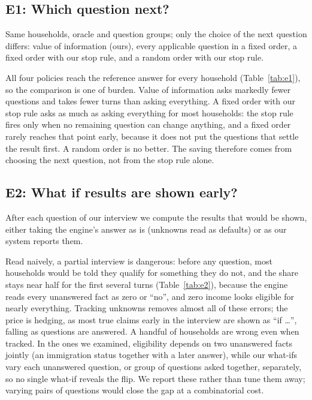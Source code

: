 \documentclass[11pt]{article}
\newcommand{\fq}{false ``you qualify''}
\begin{document}
\subsection{E1: Which question next?}
Same households, oracle and question groups; only the choice of the next question differs: value of information (ours), every applicable question in a fixed order, a fixed order with our stop rule, and a random order with our stop rule.
\begin{table}[t]\centering\small
\resizebox{\linewidth}{!}{}
\caption{E1: question-selection policies over the Tier A and Tier B households, oracle answers. Every policy reaches the reference (each asks until nothing it could ask would change the result); they differ in how many questions that takes.}
\label{tab:e1}
\end{table}
All four policies reach the reference answer for every household (Table~\ref{tab:e1}), so the comparison is one of burden. Value of information asks markedly fewer questions and takes fewer turns than asking everything. A fixed order with our stop rule asks as much as asking everything for most households: the stop rule fires only when no remaining question can change anything, and a fixed order rarely reaches that point early, because it does not put the questions that settle the result first. A random order is no better. The saving therefore comes from choosing the next question, not from the stop rule alone.

\subsection{E2: What if results are shown early?}
After each question of our interview we compute the results that would be shown, either taking the engine's answer as is (unknowns read as defaults) or as our system reports them.
\begin{table}[t]\centering\small
\resizebox{\linewidth}{!}{}
\caption{E2: households whose results, if shown after this many turns, would include a \fq. \emph{Naive}: the engine's answer with unknowns read as its defaults. \emph{Tracked}: what our system reports. \emph{Hedged}: true claims shown as ``if \ldots''.}
\label{tab:e2}
\end{table}
Read naively, a partial interview is dangerous: before any question, most households would be told they qualify for something they do not, and the share stays near half for the first several turns (Table~\ref{tab:e2}), because the engine reads every unanswered fact as zero or ``no'', and zero income looks eligible for nearly everything. Tracking unknowns removes almost all of these errors; the price is hedging, as most true claims early in the interview are shown as ``if \ldots'', falling as questions are answered. A handful of households are wrong even when tracked. In the ones we examined, eligibility depends on two unanswered facts jointly (an immigration status together with a later answer), while our what-ifs vary each unanswered question, or group of questions asked together, separately, so no single what-if reveals the flip. We report these rather than tune them away; varying pairs of questions would close the gap at a combinatorial cost.
\end{document}
